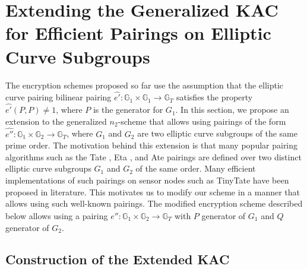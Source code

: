 \section{Extending the Generalized KAC for Efficient Pairings on Elliptic Curve Subgroups}
\label{sec:extended}

The encryption schemes proposed so far use the assumption that the elliptic curve pairing bilinear pairing $\hat{e'}:\mathbb{G}_1 \times \mathbb{G}_1\longrightarrow\mathbb{G}_T$ satisfies the property $\hat{e'}(P,P) \neq 1$, where $P$ is the generator for $G_1$. In this section, we propose an extension to the generalized $n_2$-scheme that allows using pairings of the form $\hat{e''}:\mathbb{G}_1 \times \mathbb{G}_2\longrightarrow\mathbb{G}_T$, where $G_1$ and $G_2$ are two elliptic curve subgroups of the same prime order. The motivation behind this extension is that many popular pairing algorithms such as the Tate \cite{frey1994remark}, Eta \cite{hess2006eta}, and Ate \cite{zhao2008note} pairings are defined over two distinct elliptic curve subgroups $G_1$ and $G_2$ of the same order. Many efficient implementations of such pairings on sensor nodes such as TinyTate \cite{oliveira2007tinytate} have been proposed in literature. This motivates us to modify our scheme in a manner that allows using such well-known pairings. The modified encryption scheme described below allows using a pairing $\hat{e''}:\mathbb{G}_1 \times \mathbb{G}_2\longrightarrow\mathbb{G}_T$ with $P$ generator of $G_1$ and $Q$ generator of $G_2$. 


\subsection{Construction of the Extended KAC}
\label{subsec:construction}

